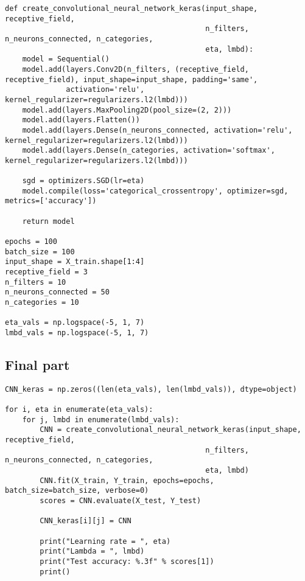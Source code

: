 \documentclass[%
oneside,                 %
final,                   %
10pt]{article}
\begin{document}
\begin{verbatim}
def create_convolutional_neural_network_keras(input_shape, receptive_field,
                                              n_filters, n_neurons_connected, n_categories,
                                              eta, lmbd):
    model = Sequential()
    model.add(layers.Conv2D(n_filters, (receptive_field, receptive_field), input_shape=input_shape, padding='same',
              activation='relu', kernel_regularizer=regularizers.l2(lmbd)))
    model.add(layers.MaxPooling2D(pool_size=(2, 2)))
    model.add(layers.Flatten())
    model.add(layers.Dense(n_neurons_connected, activation='relu', kernel_regularizer=regularizers.l2(lmbd)))
    model.add(layers.Dense(n_categories, activation='softmax', kernel_regularizer=regularizers.l2(lmbd)))
    
    sgd = optimizers.SGD(lr=eta)
    model.compile(loss='categorical_crossentropy', optimizer=sgd, metrics=['accuracy'])
    
    return model

epochs = 100
batch_size = 100
input_shape = X_train.shape[1:4]
receptive_field = 3
n_filters = 10
n_neurons_connected = 50
n_categories = 10

eta_vals = np.logspace(-5, 1, 7)
lmbd_vals = np.logspace(-5, 1, 7)

\end{verbatim}


\subsection*{Final part}


















\begin{verbatim}
CNN_keras = np.zeros((len(eta_vals), len(lmbd_vals)), dtype=object)
        
for i, eta in enumerate(eta_vals):
    for j, lmbd in enumerate(lmbd_vals):
        CNN = create_convolutional_neural_network_keras(input_shape, receptive_field,
                                              n_filters, n_neurons_connected, n_categories,
                                              eta, lmbd)
        CNN.fit(X_train, Y_train, epochs=epochs, batch_size=batch_size, verbose=0)
        scores = CNN.evaluate(X_test, Y_test)
        
        CNN_keras[i][j] = CNN
        
        print("Learning rate = ", eta)
        print("Lambda = ", lmbd)
        print("Test accuracy: %.3f" % scores[1])
        print()

\end{verbatim}
\end{document}
